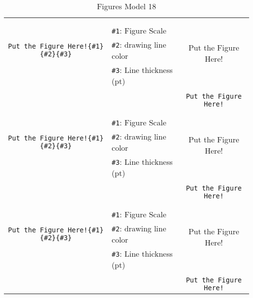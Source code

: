 \documentclass{article}
\begin{document}
\begin{table}[H]
\begin{tabular}{|c|l|c|}
	&&\multirow{5}{*}{Put the Figure Here!}\\	&&\\	&\verb|#1|: Figure Scale &\\	\verb|Put the Figure Here!{#1}{#2}{#3}|&	\verb|#2|: drawing line color &\\	&\verb|#3|: Line thickness (pt) &\\ &&\\&&	\verb|Put the Figure Here!|\\\hline 	
	&&\multirow{5}{*}{Put the Figure Here!}\\	&&\\	&\verb|#1|: Figure Scale &\\	\verb|Put the Figure Here!{#1}{#2}{#3}|&	\verb|#2|: drawing line color &\\	&\verb|#3|: Line thickness (pt) &\\ &&\\&&	\verb|Put the Figure Here!|\\\hline 	
	&&\multirow{5}{*}{Put the Figure Here!}\\	&&\\	&\verb|#1|: Figure Scale &\\	\verb|Put the Figure Here!{#1}{#2}{#3}|&	\verb|#2|: drawing line color &\\	&\verb|#3|: Line thickness (pt) &\\ &&\\&&	\verb|Put the Figure Here!|\\\hline 	\hline\end{tabular}\caption{Figures Model 18}\label{tab18}\end{table}

\fcSilabA{}

\newpage

\fcSilabB{}

\newpage

\fcSilabC{}

\newpage

\fcSilabD{}

\newpage

\fcSilabE{}

\newpage

\fcSilabF{}

\newpage

\fcSilabG{}

\newpage

\fcSilabH{}

\newpage

\fcSilabI{}

\newpage

\fcSilabJ{}

\newpage

\fcSilabK{}

\newpage

\fcSilabL{}

\newpage

\fcSilabM{}

\newpage

\fcSilabN{}

\newpage

\fcSilabO{}

\newpage

\fcSilabP{}
\end{document}
